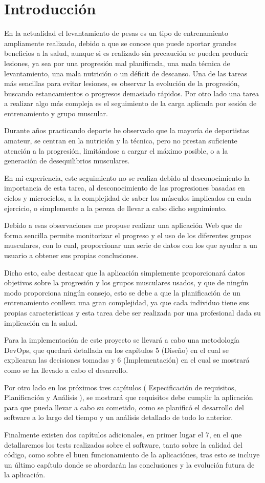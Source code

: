 \chapter{Introducción}
En la actualidad el levantamiento de pesas es un tipo de entrenamiento ampliamente realizado, debido a que se conoce que puede aportar grandes beneficios a la salud, aunque si es realizado sin precaución se pueden producir lesiones, ya sea por una progresión mal planificada, una mala técnica de levantamiento, una mala nutrición o un déficit de descanso. Una de las tareas más sencillas para evitar lesiones, es observar la evolución de la progresión, buscando estancamientos o progresos demasiado rápidos. Por otro lado una tarea a realizar algo más compleja es el seguimiento de la carga aplicada por sesión de entrenamiento y grupo muscular.

Durante años practicando deporte he observado que la mayoría de deportistas amateur, se centran en la nutrición y la técnica, pero no prestan suficiente atención a la progresión, limitándose a cargar el máximo posible, o a la generación de desequilibrios musculares. 

En mi experiencia, este seguimiento no se realiza debido al desconocimiento la importancia de esta tarea, al desconocimiento de las progresiones basadas en ciclos y \glspl{microciclo}, a la complejidad de saber los músculos implicados en cada ejercicio, o simplemente a la pereza de llevar a cabo dicho seguimiento.

Debido a esas observaciones me propuse realizar una aplicación Web que de forma sencilla permite monitorizar el progreso y el uso de los diferentes grupos musculares, con lo cual, proporcionar una serie de datos con los que ayudar a un usuario a obtener sus propias conclusiones.

Dicho esto, cabe destacar que la aplicación simplemente proporcionará datos objetivos sobre la progresión y los grupos musculares usados, y que de ningún modo proporciona ningún consejo, esto se debe a que la planificación de un entrenamiento conlleva una gran complejidad, ya que cada individuo tiene sus propias características y esta tarea debe ser realizada por una profesional dada su implicación en la salud.

Para la implementación de este proyecto se llevará a cabo una metodología \gls{DevOps}, que quedará detallada en los capítulos 5 (Diseño) en el cual se explicaran las decisiones tomadas y 6 (Implementación) en el cual se mostrará como se ha llevado a cabo el desarrollo.

Por otro lado en los próximos tres capítulos ( Especificación de requisitos, Planificación y Análisis ), se mostrará que requisitos debe cumplir la aplicación para que pueda llevar a cabo su cometido, como se planificó el desarrollo del software a lo largo del tiempo y un análisis detallado de todo lo anterior.

Finalmente existen dos capítulos adicionales, en primer lugar el 7, en el que detallaremos los tests realizados sobre el software, tanto sobre la calidad del código, como sobre el buen funcionamiento de la aplicaciónes, tras esto se incluye un último capítulo donde se abordarán las conclusiones y la evolución futura de la aplicación.

